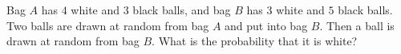 Bag $A$ has $4$ white and $3$ black balls, and bag $B$ has $3$ white and $5$ black balls. Two balls are drawn at random from bag $A$ and put into bag $B$. Then a ball is drawn at random from bag $B$. What is the probability that it is white?
